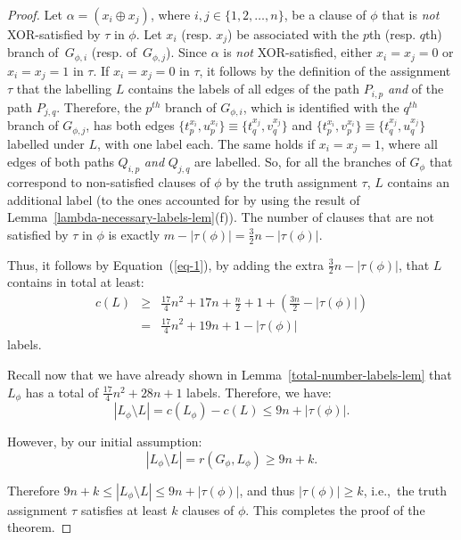 \documentclass[a4paper,UKenglish]{article}
\begin{document}
\begin{proof}
Let $\alpha =(x_{i}\oplus x_{j})$, where ${i,j\in \{1,2,\ldots ,n\}}$, be a clause of $\phi $ that is \emph{not} XOR-satisfied by $\tau$ in $\phi$.  Let $x_{i}$ (resp. $x_{j}$) be associated with the $p$th (resp. $q$th) branch of~$G_{\phi ,i}$ (resp. of~$G_{\phi ,j}$).
Since $\alpha$ is \emph{not} XOR-satisfied,
either $x_{i}=x_{j}=0$ or $x_{i}=x_{j}=1$ in $\tau $. If $x_{i}=x_{j}=0$ in $\tau $, it follows by the definition of
the assignment $\tau $ that the labelling $L $ contains the labels of
all edges of the path $P_{i,p}$ \emph{and} of the path $P_{j,q}$. Therefore, the $p^{th}$ branch of $G_{\phi,i}$, which is identified with the $q^{th}$ branch of $G_{\phi,j}$, has both edges $\{t_p ^{x_i}, u_p ^{x_i} \} \equiv \{t_q ^{x_j}, v_q ^{x_j} \}$ and $\{t_p ^{x_i}, v_p ^{x_i} \} \equiv \{t_q ^{x_j}, u_q ^{x_j} \}$ labelled under $L$, with one label each. The same holds if $x_{i}=x_{j}=1$, where all edges of both paths $Q_{i,p}$ \emph{and} $Q_{j,q}$ are labelled. So, for all the branches of $G_\phi$ that correspond to non-satisfied clauses of $\phi$ by the truth assignment $\tau$, $L$ contains an additional label (to the ones accounted for by using the result of Lemma~\ref{lambda-necessary-labels-lem}(f)). The number of clauses that are not satisfied by $\tau$ in $\phi$ is exactly $m-|\tau(\phi)|= \frac{3}{2} n - |\tau(\phi)|$.

Thus, it follows by Equation~(\ref{eq-1}), by adding the extra $\frac{3}{2} n - |\tau(\phi)|$, that $L$ contains in total at least:
\begin{eqnarray*}
c(L) &\geq& \frac{17}{4} n^2 +17n +\frac{n}{2} +1 + (\frac{3n}{2} - |\tau(\phi)|) \\
     &  = & \frac{17}{4} n^2 +19n +1 - |\tau(\phi)|
\end{eqnarray*}
labels.

Recall now that we have already shown in Lemma~\ref{total-number-labels-lem} that $L_\phi$ has a total of $\frac{17}{4} n^2 +28n +1$ labels. Therefore, we have:
\[|L _{\phi }\setminus L | = c(L_\phi) - c(L) \leq 9n+|\tau (\phi )|.\]

However, by our initial assumption:
\[|L _{\phi }\setminus L | =r(G_\phi, L_\phi) \geq 9n+k.\]

Therefore $9n+k\leq |L _{\phi }\setminus L |\leq
9n+|\tau (\phi )|$, and thus $|\tau (\phi )|\geq k$, i.e.,~the truth
assignment $\tau $ satisfies at least $k$ clauses of $\phi $. This completes
the proof of the theorem.
\end{proof}
\end{document}
